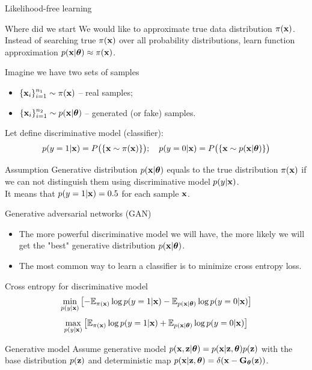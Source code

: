 \begin{frame}{Likelihood-free learning}
	\begin{block}{Where did we start}
	 We would like to approximate true data distribution $\pi(\mathbf{x})$.
	Instead of searching true $\pi(\mathbf{x})$ over all probability distributions, learn function approximation $p(\mathbf{x} | \boldsymbol{\theta}) \approx \pi(\mathbf{x})$.
	\end{block}
	Imagine we have two sets of samples 
	\begin{itemize}
		\item $\{\mathbf{x}_i\}_{i=1}^{n_1} \sim \pi(\mathbf{x})$ -- real samples;
		\item $\{\mathbf{x}_i\}_{i=1}^{n_2} \sim p(\mathbf{x} | \boldsymbol{\theta})$ -- generated (or fake) samples.
	\end{itemize}
	Let define discriminative model (classifier):
	\[
		p(y = 1 | \mathbf{x}) = P\bigl(\{\mathbf{x} \sim \pi(\mathbf{x})\}\bigr); \quad p(y = 0 | \mathbf{x}) = P\bigl(\{\mathbf{x} \sim p(\mathbf{x} | \boldsymbol{\theta})\}\bigr)
	\]
	\vspace{-0.5cm}
	\begin{block}{Assumption}
		Generative distribution $p(\mathbf{x} | \boldsymbol{\theta})$ equals to the true distribution $\pi(\mathbf{x})$ if we can not distinguish them using discriminative model $p(y | \mathbf{x})$. \\
		It means that $p(y = 1 | \mathbf{x}) = 0.5$ for each sample $\mathbf{x}$.
	\end{block}

\end{frame}
\begin{frame}{Generative adversarial networks (GAN)}
	\begin{itemize}
		\item The more powerful discriminative model we will have, the more likely we will get the "best" generative distribution $p(\mathbf{x} | \boldsymbol{\theta})$.
		\item The most common way to learn a classifier is to minimize cross entropy loss.
	\end{itemize}
	\begin{block}{Cross entropy for discriminative model}
		\vspace{-0.3cm}
		\[
			\min_{p(y | \mathbf{x})} \left[ - \mathbb{E}_{\pi(\mathbf{x})} \log p(y = 1 | \mathbf{x}) - \mathbb{E}_{p(\mathbf{x} | \boldsymbol{\theta})} \log p(y = 0 | \mathbf{x}) \right] 
		\]
		\[
			\max_{p(y | \mathbf{x})} \left[\mathbb{E}_{\pi(\mathbf{x})} \log p(y = 1 | \mathbf{x}) + \mathbb{E}_{p(\mathbf{x} | \boldsymbol{\theta})} \log p(y = 0 | \mathbf{x}) \right] 
		\]
	\end{block}
	\vspace{-0.3cm}
	\begin{block}{Generative model}
		Assume generative model $p(\mathbf{x}, \mathbf{z} | \boldsymbol{\theta}) = p (\mathbf{x} | \mathbf{z}, \boldsymbol{\theta}) p(\mathbf{z}) $ with the base distribution $p(\mathbf{z})$ and deterministic map $p (\mathbf{x} | \mathbf{z}, \boldsymbol{\theta}) = \delta (\mathbf{x} - \mathbf{G}_{\boldsymbol{\theta}}(\mathbf{z}))$.
	\end{block}
	
\end{frame}
